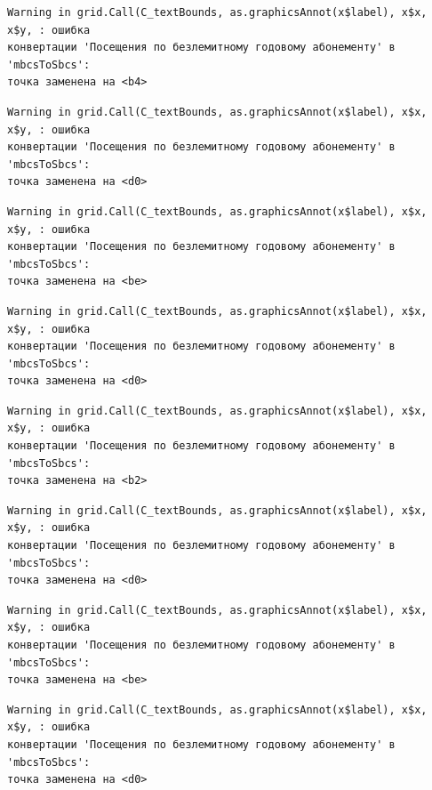 \documentclass[
  letterpaper,
  DIV=11,
  numbers=noendperiod]{scrreprt}
\begin{document}
\begin{verbatim}
Warning in grid.Call(C_textBounds, as.graphicsAnnot(x$label), x$x, x$y, : ошибка
конвертации 'Посещения по безлемитному годовому абонементу' в 'mbcsToSbcs':
точка заменена на <b4>
\end{verbatim}

\begin{verbatim}
Warning in grid.Call(C_textBounds, as.graphicsAnnot(x$label), x$x, x$y, : ошибка
конвертации 'Посещения по безлемитному годовому абонементу' в 'mbcsToSbcs':
точка заменена на <d0>
\end{verbatim}

\begin{verbatim}
Warning in grid.Call(C_textBounds, as.graphicsAnnot(x$label), x$x, x$y, : ошибка
конвертации 'Посещения по безлемитному годовому абонементу' в 'mbcsToSbcs':
точка заменена на <be>
\end{verbatim}

\begin{verbatim}
Warning in grid.Call(C_textBounds, as.graphicsAnnot(x$label), x$x, x$y, : ошибка
конвертации 'Посещения по безлемитному годовому абонементу' в 'mbcsToSbcs':
точка заменена на <d0>
\end{verbatim}

\begin{verbatim}
Warning in grid.Call(C_textBounds, as.graphicsAnnot(x$label), x$x, x$y, : ошибка
конвертации 'Посещения по безлемитному годовому абонементу' в 'mbcsToSbcs':
точка заменена на <b2>
\end{verbatim}

\begin{verbatim}
Warning in grid.Call(C_textBounds, as.graphicsAnnot(x$label), x$x, x$y, : ошибка
конвертации 'Посещения по безлемитному годовому абонементу' в 'mbcsToSbcs':
точка заменена на <d0>
\end{verbatim}

\begin{verbatim}
Warning in grid.Call(C_textBounds, as.graphicsAnnot(x$label), x$x, x$y, : ошибка
конвертации 'Посещения по безлемитному годовому абонементу' в 'mbcsToSbcs':
точка заменена на <be>
\end{verbatim}

\begin{verbatim}
Warning in grid.Call(C_textBounds, as.graphicsAnnot(x$label), x$x, x$y, : ошибка
конвертации 'Посещения по безлемитному годовому абонементу' в 'mbcsToSbcs':
точка заменена на <d0>
\end{verbatim}
\end{document}
